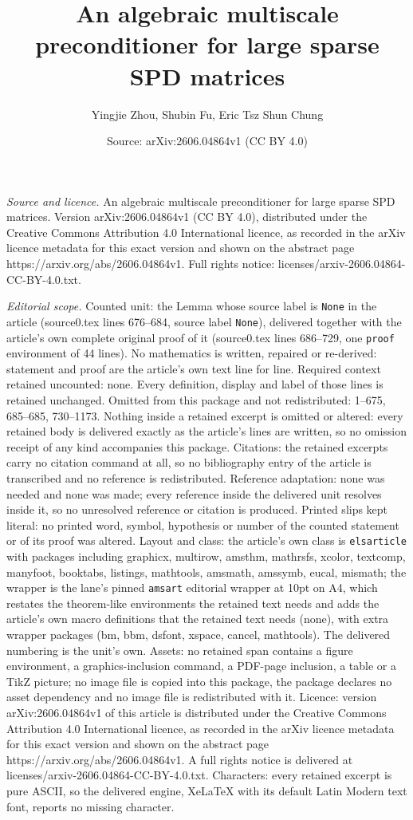 \documentclass[10pt,a4paper]{amsart}
\title[An algebraic multiscale preconditioner for large sparse SPD ]{An algebraic multiscale preconditioner for large sparse SPD matrices}
\author{Yingjie Zhou, Shubin Fu, Eric Tsz Shun Chung}
\date{Source: arXiv:2606.04864v1 (CC BY 4.0)}
\begin{document}
\maketitle

\noindent\emph{Source and licence.} An algebraic multiscale preconditioner for large sparse SPD matrices. Version arXiv:2606.04864v1 (CC BY 4.0), distributed under the Creative Commons Attribution 4.0 International licence, as recorded in the arXiv licence metadata for this exact version and shown on the abstract page https://arxiv.org/abs/2606.04864v1. Full rights notice: licenses/arxiv-2606.04864-CC-BY-4.0.txt.\par\smallskip

\noindent\textit{Editorial scope.} Counted unit: the Lemma whose source label is \texttt{None} in the article (source0.tex lines 676--684, source label \texttt{None}), delivered together with the article's own complete original proof of it (source0.tex lines 686--729, one \texttt{proof} environment of 44 lines). No mathematics is written, repaired or re-derived: statement and proof are the article's own text line for line. Required context retained uncounted: none. Every definition, display and label of those lines is retained unchanged. Omitted from this package and not redistributed: 1--675, 685--685, 730--1173. Nothing inside a retained excerpt is omitted or altered: every retained body is delivered exactly as the article's lines are written, so no omission receipt of any kind accompanies this package. Citations: the retained excerpts carry no citation command at all, so no bibliography entry of the article is transcribed and no reference is redistributed. Reference adaptation: none was needed and none was made; every reference inside the delivered unit resolves inside it, so no unresolved reference or citation is produced. Printed slips kept literal: no printed word, symbol, hypothesis or number of the counted statement or of its proof was altered. Layout and class: the article's own class is \texttt{elsarticle} with packages including graphicx, multirow, amsthm, mathrsfs, xcolor, textcomp, manyfoot, booktabs, listings, mathtools, amsmath, amssymb, eucal, mismath; the wrapper is the lane's pinned \texttt{amsart} editorial wrapper at 10pt on A4, which restates the theorem-like environments the retained text needs and adds the article's own macro definitions that the retained text needs (none), with extra wrapper packages (bm, bbm, dsfont, xspace, cancel, mathtools). The delivered numbering is the unit's own. Assets: no retained span contains a figure environment, a graphics-inclusion command, a PDF-page inclusion, a table or a TikZ picture; no image file is copied into this package, the package declares no asset dependency and no image file is redistributed with it. Licence: version arXiv:2606.04864v1 of this article is distributed under the Creative Commons Attribution 4.0 International licence, as recorded in the arXiv licence metadata for this exact version and shown on the abstract page https://arxiv.org/abs/2606.04864v1. A full rights notice is delivered at licenses/arxiv-2606.04864-CC-BY-4.0.txt. Characters: every retained excerpt is pure ASCII, so the delivered engine, XeLaTeX with its default Latin Modern text font, reports no missing character.
\end{document}
